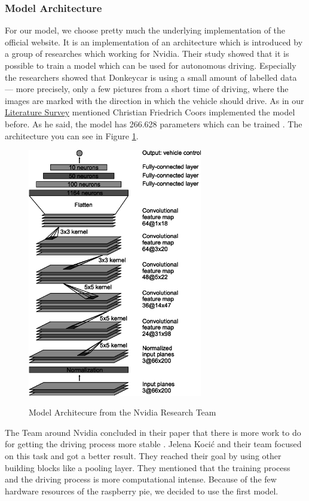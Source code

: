 \documentclass[journal]{IEEEtran}
\begin{document}
\subsubsection{Model Architecture}
\label{subsec:ModelArchitecture}
For our model, we choose pretty much the underlying implementation of the official  website. It is an implementation of an architecture which is introduced by a group of researches which working for Nvidia. Their study showed that it is possible to train a model which can be used for autonomous driving. Especially the researchers showed that Donkeycar is using a small amount of labelled data — more precisely,  only a few pictures from a short time of driving, where the images are marked with the direction in which the vehicle should drive\cite{LearningForSelf-DrivingCars}. As in our \hyperref[sec:LiteratureSurvey]{Literature Survey} mentioned Christian Friedrich Coors implemented the model before.  As he said, the model has 266.628 parameters which can be trained \cite{Coors}. The architecture you can see in Figure \ref{fig:Archi}.
\begin{figure}
  \begin{center}
  \includegraphics[width=3in]{photo/CNNArchitecture.png}\\
  \caption{Model Architecure from the Nvidia Research Team \cite{LearningForSelf-DrivingCars}}
  \label{fig:Archi}
  \end{center}
\end{figure}
The Team around Nvidia concluded in their paper that there is more work to do for getting the driving process more stable \cite{LearningForSelf-DrivingCars}. Jelena Kocić and their team focused on this task and got a better result. They reached their goal by using other building blocks like a pooling layer. They mentioned that the training process and the driving process is more computational intense. Because of the few hardware resources of the raspberry pie, we decided to use the first model. \cite{AutomotivePlatformsAutonomousDriving}
\end{document}
